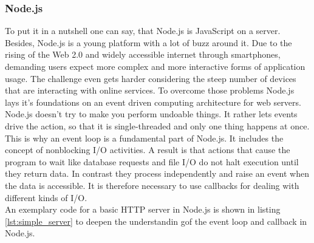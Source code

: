 \subsubsection{Node.js}
\label{node.js}

To put it in a nutshell one can say, that Node.js is JavaScript on a server.\\
Besides, Node.js is a young platform with a lot of buzz around it. Due to the
rising of the Web 2.0 and widely accessible internet through smartphones,
demanding users expect more complex and more interactive forms of application usage. 
The challenge even gets harder considering the steep number of
devices that are interacting with online services.%
To overcome those problems Node.js lays it's foundations on an event driven
computing architecture for web servers.\\
Node.js doesn't try to make you perform undoable things. It rather lets events drive the
action, so that it is single-threaded and only one thing happens at once. This
is why an event loop is a fundamental part of Node.js. It includes the concept
of nonblocking I/O activities. A result is that actions that cause the program
to wait like database requests and file I/O  do not halt execution until they
return data. In contrast they process independently and raise an event when the
data is accessible. It is therefore necessary to use callbacks for dealing with
different kinds of I/O.\\
An exemplary code for a basic HTTP server in Node.js is shown in listing
\ref{lst:simple_server} to deepen the understandin gof the event loop and
callback in Node.js.





